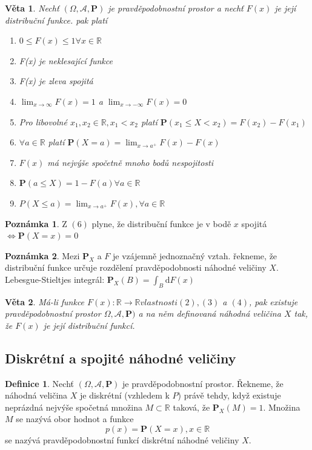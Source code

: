 \documentclass[a4]{report}
\newtheorem{theorem}{Věta}
\theoremstyle{definition}
\newtheorem{definition}{Definice}[section]
\newtheorem{notes}{Poznámka}[section]
\begin{document}
{\begin{theorem}
Nechť $(\Omega,\mathcal{A},\textbf{P})$ je pravděpodobnostní prostor a nechť $F(x)$ je její distribuční funkce. pak platí
\begin{enumerate}
\item $0\leq F(x)\leq 1\forall x \in \mathbb{R}$
\item F(x) je neklesající funkce
\item F(x) je zleva spojitá
\item $\lim_{x\rightarrow \infty}F(x)=1$ a  $\lim_{x\rightarrow -\infty}F(x)=0$
\item Pro libovolné $x_1,x_2 \in \mathbb{R}, x_1<x_2$ platí $\textbf{P}(x_1\leq X<x_2)=F(x_2)-F(x_1)$
\item $\forall a \in \mathbb{R}$ platí $\textbf{P}(X=a)=\lim_{x\rightarrow a^+} F(x)-F(x)$
\item $F(x)$ má nejvýše spočetně mnoho bodů nespojitosti
\item $\textbf{P}(a\leq X)=1-F(a) \forall a \in \mathbb{R}$
\item $P(X\leq a) = \lim_{x\rightarrow a^+} F(x) , \forall a \in \mathbb{R}$
\end{enumerate}
\end{theorem}

\begin{notes}
Z $(6)$ plyne, že distribuční funkce je v bodě $x$ spojitá $\Leftrightarrow \textbf{P}(X=x)=0$ 
\end{notes}


\begin{notes}
Mezi $\textbf{P}_X$ a $F$ je vzájemně jednoznačný vztah. řekneme, že distribuční funkce určuje rozdělení pravděpodobnosti náhodné veličiny $X$. Lebesgue-Stieltjes integrál: $\textbf{P}_X(B)=\int_B \mathrm{d}F(x)$
\end{notes}

\begin{theorem}
Má-li funkce $F(x):\mathbb{R}\rightarrow \mathbb{R} vlastnosti (2),(3) $ a $(4)$, pak existuje pravděpodobnostní prostor $\Omega,\mathcal{A},\textbf{P})$ a na něm definovaná náhodná veličina $X$ tak, že $F(x)$ je její distribuční funkcí.
\end{theorem}



\subsection{Diskrétní a spojité náhodné veličiny}
\begin{definition}
Nechť $(\Omega,\mathcal{A},\textbf{P})$ je pravděpodobnostní prostor.  Řekneme, že náhodná veličina $X$ je diskrétní (vzhledem k $P$) právě tehdy, když existuje neprázdná nejvýše spočetná množina $M \subset \mathbb{R}$ taková, že $\textbf{P}_X(M)=1$. Množina $M$ se nazývá obor hodnot a funkce \begin{equation}
p(x)=\textbf{P}(X=x),x\in \mathbb{R}
\end{equation}
se nazývá pravděpodobnostní funkcí diskrétní náhodné veličiny $X$.
\end{definition}

}
\end{document}
